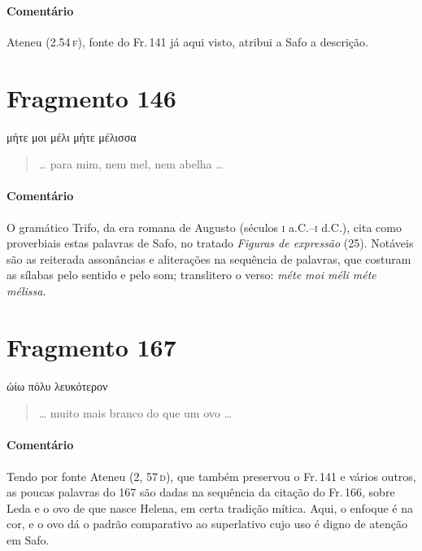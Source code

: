 \medskip

{\paragraph{Comentário} Ateneu (2.54\,\textsc{f}), fonte do Fr.\,141 já aqui visto, atribui a Safo a descrição.}


\pagebreak
\section{Fragmento 146}

\begin{gkverse}
μήτε μοι μέλι μήτε μέλισσα
\end{gkverse}

\begin{verse}
\ldots{} para mim, nem mel, nem abelha \ldots{}
\end{verse}

\medskip

{\paragraph{Comentário} O gramático Trifo, da era romana de Augusto (séculos \textsc{i} a.C.--\textsc{i} d.C.), 
cita como proverbiais estas palavras de Safo, no tratado \textit{Figuras de expressão} (25).
Notáveis são as reiterada assonâncias e aliterações na sequência de palavras, que costuram as sílabas pelo sentido e pelo som; translitero o verso: \textit{méte moi méli méte mélissa}.}


\section{Fragmento 167}

\begin{gkverse}
ὠίω πόλυ λευκότερον
\end{gkverse}

\begin{verse}
\ldots{} muito mais branco do que um ovo \ldots{}
\end{verse}

\medskip

{\paragraph{Comentário} Tendo por fonte Ateneu (2, 57\,\textsc{d}), que também preservou o Fr.\,141 e vários outros, as poucas palavras do 167 são dadas na sequência da citação do Fr.\,166, sobre Leda e o ovo de que nasce Helena, em certa tradição mítica. Aqui, o enfoque é na cor, e o ovo dá o padrão comparativo ao superlativo cujo uso é digno de atenção em Safo.}


